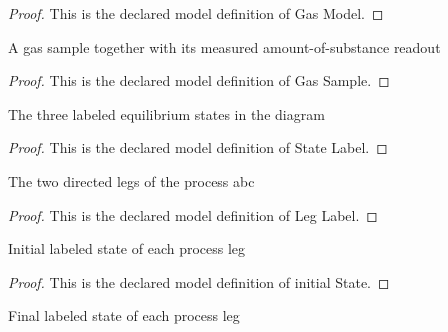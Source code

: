 \begin{proof}
  This is the declared model definition of Gas Model.
\end{proof}
\begin{definition}
  \label{def:physics:phyx-mini-0338:phyxminiproblems-problemphyxmini0338-gassample}
  A gas sample together with its measured amount-of-substance readout
\end{definition}
\begin{proof}
  This is the declared model definition of Gas Sample.
\end{proof}
\begin{definition}
  \label{def:physics:phyx-mini-0338:phyxminiproblems-problemphyxmini0338-statelabel}
  The three labeled equilibrium states in the diagram
\end{definition}
\begin{proof}
  This is the declared model definition of State Label.
\end{proof}
\begin{definition}
  \label{def:physics:phyx-mini-0338:phyxminiproblems-problemphyxmini0338-leglabel}
  The two directed legs of the process abc
\end{definition}
\begin{proof}
  This is the declared model definition of Leg Label.
\end{proof}
\begin{definition}
  \label{def:physics:phyx-mini-0338:phyxminiproblems-problemphyxmini0338-leglabel-initialstate}
  Initial labeled state of each process leg
\end{definition}
\begin{proof}
  This is the declared model definition of initial State.
\end{proof}
\begin{definition}
  \label{def:physics:phyx-mini-0338:phyxminiproblems-problemphyxmini0338-leglabel-finalstate}
  Final labeled state of each process leg
\end{definition}
